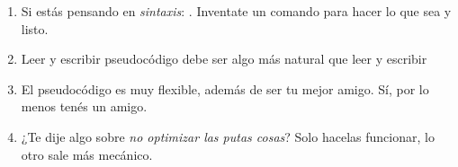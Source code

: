 \begin{enumerate}[label=\tiny\purple{\faIcon{snowman}}]
\begin{enumerate}[label=\red{\faIcon{atom}}$_{(\arabic*)}$]
          \item Si estás pensando en \textit{sintaxis}: . Inventate un comando para hacer
              lo que sea y listo.

          \item Leer y escribir pseudocódigo debe ser algo más natural que leer y escribir \python

          \item El pseudocódigo es muy flexible, además de ser tu mejor amigo. {\color{gray!20}Sí, por lo menos tenés un amigo.}

          \item ¿Te dije algo sobre \textit{no optimizar las putas cosas}? Solo hacelas funcionar, lo otro sale más mecánico.
        \end{enumerate}
\end{enumerate}
